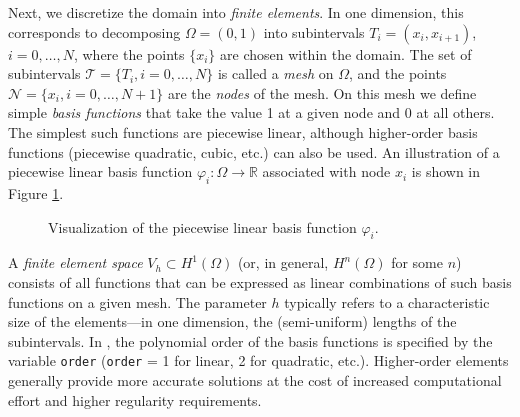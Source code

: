 Next, we discretize the domain into \textit{finite elements}. In one dimension, this corresponds to decomposing $\Omega = (0,1)$ into subintervals $T_i = (x_i, x_{i+1})$, $i=0,\ldots,N$, where the points $\{x_i\}$ are chosen within the domain. The set of subintervals $\mathcal{T} = \{T_i, i=0,\ldots,N\}$ is called a \textit{mesh} on $\Omega$, and the points $\mathcal{N} = \{x_i, i=0,\ldots,N+1\}$ are the \textit{nodes} of the mesh. On this mesh we define simple \textit{basis functions} that take the value 1 at a given node and 0 at all others. The simplest such functions are piecewise linear, although higher-order basis functions (piecewise quadratic, cubic, etc.) can also be used. An illustration of a piecewise linear basis function $\varphi_i:\Omega \to \mathbb{R}$ associated with node $x_i$ is shown in Figure \ref{fig:hatfct}.
\begin{figure}
\centering
    \caption{Visualization of the piecewise linear basis function $\varphi_i$.}
    \label{fig:hatfct}
\end{figure}

A \textit{finite element space} $V_{h}\subset H^1(\Omega)$ (or, in general, $H^n(\Omega)$ for some $n$) consists of all functions that can be expressed as linear combinations of such basis functions on a given mesh. The parameter $h$ typically refers to a characteristic size of the elements—in one dimension, the (semi-uniform) lengths of the subintervals. In \ngsolve, the polynomial order of the basis functions is specified by the variable \texttt{order} (\texttt{order} = 1 for linear, 2 for quadratic, etc.). Higher-order elements generally provide more accurate solutions at the cost of increased computational effort and higher regularity requirements.\\

